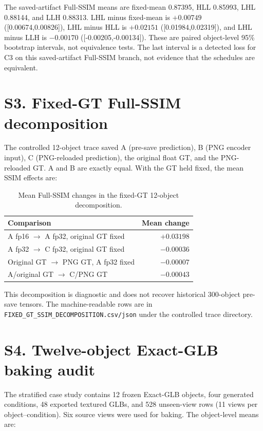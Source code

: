 \documentclass[10pt]{article}
\begin{document}
The saved-artifact Full-SSIM means are fixed-mean 0.87395, HLL 0.85993, LHL
0.88144, and LLH 0.88313. LHL minus fixed-mean is $+0.00749$
([0.00674,0.00826]), LHL minus HLL is $+0.02151$ ([0.01984,0.02319]), and
LHL minus LLH is $-0.00170$ ([-0.00205,-0.00134]). These are paired
object-level 95\% bootstrap intervals, not equivalence tests. The last
interval is a detected loss for C3 on this saved-artifact Full-SSIM branch,
not evidence that the schedules are equivalent.

\section{S3. Fixed-GT Full-SSIM decomposition}

The controlled 12-object trace saved A (pre-save prediction), B (PNG encoder
input), C (PNG-reloaded prediction), the original float GT, and the
PNG-reloaded GT. A and B are exactly equal. With the GT held fixed, the mean
SSIM effects are:

\begin{table}[h]
\centering\small
\caption{Mean Full-SSIM changes in the fixed-GT 12-object decomposition.}
\begin{tabular}{lr}
\toprule
Comparison & Mean change \\
\midrule
A fp16 $\rightarrow$ A fp32, original GT fixed & $+0.03198$ \\
A fp32 $\rightarrow$ C fp32, original GT fixed & $-0.00036$ \\
Original GT $\rightarrow$ PNG GT, A fp32 fixed & $-0.00007$ \\
A/original GT $\rightarrow$ C/PNG GT & $-0.00043$ \\
\bottomrule
\end{tabular}
\end{table}

This decomposition is diagnostic and does not recover historical 300-object
pre-save tensors. The machine-readable rows are in
\texttt{FIXED\_GT\_SSIM\_DECOMPOSITION.csv/json} under the controlled trace
directory.

\section{S4. Twelve-object Exact-GLB baking audit}

The stratified case study contains 12 frozen Exact-GLB objects, four generated
conditions, 48 exported textured GLBs, and 528 unseen-view rows (11 views per
object--condition). Six source views were used for baking. The object-level
means are:
\end{document}
